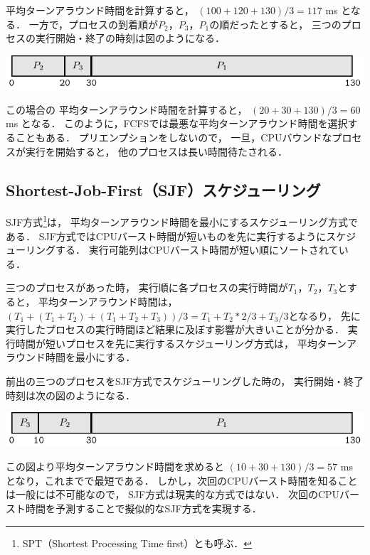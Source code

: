平均ターンアラウンド時間を計算すると，
$(100+120+130) / 3 = 117$ ms となる．
一方で，プロセスの到着順が$P_2$，$P_3$，$P_1$の順だったとすると，
三つのプロセスの実行開始・終了の時刻は図のようになる．

\begin{center}
  \includegraphics[scale=1.0]{GanntChart/fcfs2.pdf}
\end{center}

この場合の
平均ターンアラウンド時間を計算すると，
$(20+30+130) / 3 = 60$ ms となる．
このように，FCFSでは最悪な平均ターンアラウンド時間を選択することもある．
プリエンプションをしないので，
一旦，CPUバウンドなプロセスが実行を開始すると，
他のプロセスは長い時間待たされる．

\subsection{Shortest-Job-First（SJF）スケジューリング}
SJF方式\footnote{SPT（Shortest Processing Time first）とも呼ぶ．}は，
平均ターンアラウンド時間を最小にするスケジューリング方式である．
SJF方式ではCPUバースト時間が短いものを先に実行するようにスケジューリングする．
実行可能列はCPUバースト時間が短い順にソートされている．

三つのプロセスがあった時，
実行順に各プロセスの実行時間が$T_1$，$T_2$，$T_3$とすると，
平均ターンアラウンド時間は，
$(T_1+(T_1+T_2)+(T_1+T_2+T_3))/3=T_1+T_2*2/3+T_3/3$となるり，
先に実行したプロセスの実行時間ほど結果に及ぼす影響が大きいことが分かる．
実行時間が短いプロセスを先に実行するスケジューリング方式は，
平均ターンアラウンド時間を最小にする．

前出の三つのプロセスをSJF方式でスケジューリングした時の，
実行開始・終了時刻は次の図のようになる．

\begin{center}
  \includegraphics[scale=1.0]{GanntChart/sjf1.pdf}
\end{center}

この図より平均ターンアラウンド時間を求めると
$(10+30+130)/3 = 57$ ms となり，これまでで最短である．
しかし，次回のCPUバースト時間を知ることは一般には不可能なので，
SJF方式は現実的な方式ではない．
次回のCPUバースト時間を予測することで擬似的なSJF方式を実現する．

